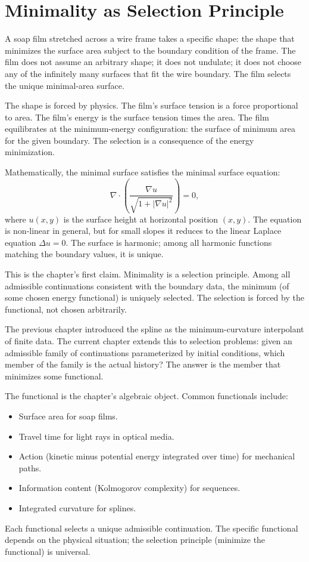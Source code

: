 \section{Minimality as Selection Principle}
\label{se:minimality-as-selection-principle}

A soap film stretched across a wire frame takes a specific shape: the
shape that minimizes the surface area subject to the boundary
condition of the frame. The film does not assume an arbitrary shape;
it does not undulate; it does not choose any of the infinitely many
surfaces that fit the wire boundary. The film selects the unique
minimal-area surface.

The shape is forced by physics. The film's surface tension is a force
proportional to area. The film's energy is the surface tension times
the area. The film equilibrates at the minimum-energy configuration:
the surface of minimum area for the given boundary. The selection is
a consequence of the energy minimization.

Mathematically, the minimal surface satisfies the minimal surface
equation:
\[
\nabla \cdot \left(\frac{\nabla u}{\sqrt{1 + |\nabla u|^2}}\right) = 0,
\]
where $u(x, y)$ is the surface height at horizontal position $(x, y)$.
The equation is non-linear in general, but for small slopes it
reduces to the linear Laplace equation $\Delta u = 0$. The surface
is harmonic; among all harmonic functions matching the boundary
values, it is unique.

This is the chapter's first claim. Minimality is a selection principle.
Among all admissible continuations consistent with the boundary data,
the minimum (of some chosen energy functional) is uniquely selected.
The selection is forced by the functional, not chosen arbitrarily.

The previous chapter introduced the spline as the minimum-curvature
interpolant of finite data. The current chapter extends this to
selection problems: given an admissible family of continuations
parameterized by initial conditions, which member of the family is
the actual history? The answer is the member that minimizes some
functional.

The functional is the chapter's algebraic object. Common functionals
include:
\begin{itemize}
\item Surface area for soap films.
\item Travel time for light rays in optical media.
\item Action (kinetic minus potential energy integrated over time)
for mechanical paths.
\item Information content (Kolmogorov complexity) for sequences.
\item Integrated curvature for splines.
\end{itemize}
Each functional selects a unique admissible continuation. The
specific functional depends on the physical situation; the selection
principle (minimize the functional) is universal.

